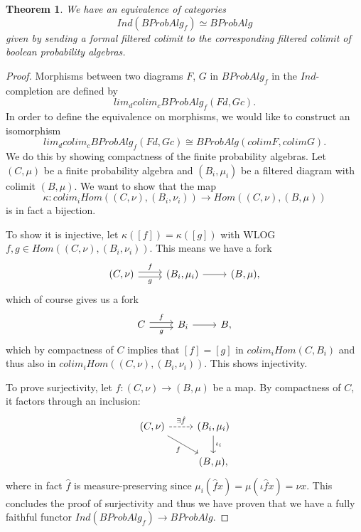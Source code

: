 \documentclass[a4paper,draft]{amsproc}
\theoremstyle{plain}
\newtheorem{theorem}{Theorem}[section]
\theoremstyle{definition}
\theoremstyle{remark}
\numberwithin{equation}{section}
\begin{document}
\begin{theorem} We have an equivalence of categories
\[
Ind(BProbAlg_f) \simeq BProbAlg
\]
given by sending a formal filtered colimit to the corresponding filtered colimit of boolean probability algebras.
\end{theorem}
\begin{proof}
Morphisms between two diagrams $F$, $G$ in $BProbAlg_f$ in the $Ind$-completion are defined by
\[
lim_d colim_c BProbAlg_f(F d, G c).
\]
In order to define the equivalence on morphisms, we would like to construct an isomorphism
\[
lim_d colim_c BProbAlg_f(F d, G c) \cong BProbAlg(colim F, colim G).
\]
We do this by showing compactness of the finite probability algebras. Let $(C, \mu)$ be a finite probability algebra and $(B_i, \mu_i)$ be a filtered diagram with colimit $(B, \mu)$. We want to show that the map
\[
\kappa: colim_i Hom((C, \nu), (B_i, \nu_i)) \to Hom((C,\nu), (B,\mu))
\]
is in fact a bijection.

To show it is injective, let $\kappa([f]) = \kappa([g])$ with WLOG $f,g \in Hom((C,\nu), (B_i, \nu_i))$. This means we have a fork
\[
\begin{tikzcd}
{(C,\nu)} \arrow[r, "f", shift left] \arrow[r, "g"', shift right] & {(B_i,\mu_i)} \arrow[r] & {(B,\mu)},
\end{tikzcd}
\]
which of course gives us a fork
\[
\begin{tikzcd}
C \arrow[r, "f", shift left] \arrow[r, "g"', shift right] & B_i \arrow[r] & B,
\end{tikzcd}
\]
which by compactness of $C$ implies that $[f] = [g]$ in $colim_i Hom(C,B_i)$ and thus also in $colim_i Hom((C,\nu), (B_i, \nu_i))$. This shows injectivity.

To prove surjectivity, let $f:(C, \nu) \to (B,\mu)$ be a map. By compactness of $C$, it factors through an inclusion:
\[
\begin{tikzcd}
{(C,\nu)} \arrow[r, "\exists \hat{f}", dashed] \arrow[rd, "f"'] & {(B_i,\mu_i)} \arrow[d, "\iota_i"] \\
                                                                & {(B,\mu)}                         ,
\end{tikzcd}
\]
where in fact $\hat{f}$ is measure-preserving since $\mu_i(\hat{f} x) = \mu(\iota \hat{f} x) = \nu x$. This concludes the proof of surjectivity and thus we have proven that we have a fully faithful functor $Ind(BProbAlg_f) \to BProbAlg$.


\end{proof}
\end{document}
